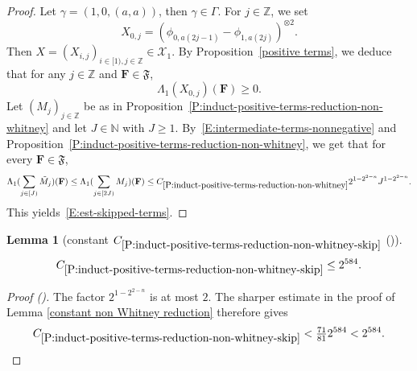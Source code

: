 \documentclass[12pt,reqno]{amsart}
\newcommand{\auto}{{({\tiny\faCar})}}
\theoremstyle{plain}
\newtheorem{lemma}[theorem]{Lemma}
\numberwithin{equation}{section}
\theoremstyle{remark}
\newcommand{\using}[1]{}
\newcommand{\Z}{{\mathbb Z}}
\newcommand{\N}{{\mathbb N}}
\begin{document}
\begin{proof}
Let $\gamma=(1,0,(a,a))$, then $\gamma \in \Gamma$. For $j\in \Z$, we set
\[
X_{0,j}=({\phi}_{0,a(2j-1)}-{\phi}_{1,a(2j)})^{\otimes 2}.
\]
Then $X=(X_{i,j})_{i\in [1),j\in \Z} \in \mathcal X_1$. By Proposition~\ref{positive terms}, we deduce that for any $j\in \Z$ and $\mathbf{F} \in \mathfrak{F}$,
\begin{equation}\label{E:intermediate-terms-nonnegative}
\Lambda_1(X_{0,j})(\mathbf{F}) \geq 0.
\end{equation}
Let $(M_j)_{j\in \Z}$ be as in Proposition~\ref{P:induct-positive-terms-reduction-non-whitney} and let $J\in\N$ with $J\ge1$. By~\eqref{E:intermediate-terms-nonnegative} and Proposition~\ref{P:induct-positive-terms-reduction-non-whitney}, we get that for every $\mathbf{F} \in \mathfrak{F}$,
\[
\Lambda_1(\sum_{j\in [J)} \tilde{M}_j)(\mathbf{F})
\leq \Lambda_1(\sum_{j\in [2J)} M_j)(\mathbf{F})
\leq C_{\ref{P:induct-positive-terms-reduction-non-whitney}} 2^{1-2^{2-n}} J^{1-2^{2-n}}.
\]
This yields~\eqref{E:est-skipped-terms}.
\end{proof}

\begin{lemma}[constant $C_{\ref{P:induct-positive-terms-reduction-non-whitney-skip}}$ \auto]\label{constant non Whitney skip reduction}\using{constant non Whitney reduction}\using{P:induct-positive-terms-reduction-non-whitney-skip}
\begin{equation}\label{constant non Whitney skip reduction bound}
C_{\ref{P:induct-positive-terms-reduction-non-whitney-skip}}\le2^{584}.
\end{equation}
\end{lemma}
\begin{proof}[Proof \auto]
The factor $2^{1-2^{2-n}}$ is at most $2$. The sharper estimate in the proof of Lemma \ref{constant non Whitney reduction} therefore gives
\[
C_{\ref{P:induct-positive-terms-reduction-non-whitney-skip}}
<\tfrac{71}{81}2^{584}<2^{584}.
\]
\end{proof}
\end{document}
